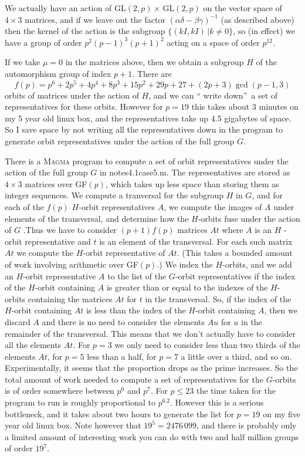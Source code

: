 \documentclass[10pt]{article}
\begin{document}
We actually have an action of GL$(2,p)\times \,$GL$(2,p)$ on the vector
space of $4\times 3$ matrices, and if we leave out the factor $(\alpha
\delta -\beta \gamma )^{-1}$ (as described above) then the kernel of the
action is the subgroup $\{(kI,kI)\,|$\thinspace $k\neq 0\}$, so (in effect)
we have a group of order $p^{2}\left( p-1\right) ^{3}\left( p+1\right) ^{2}$
acting on a space of order $p^{12}$.

If we take $\mu =0$ in the matrices above, then we obtain a subgroup $H$ of
the automorphism group of index $p+1$. There are 
\[
f(p)=p^{6}+2p^{5}+4p^{4}+8p^{3}+15p^{2}+29p+27+(2p+3)\gcd (p-1,3)
\]%
orbits of matrices under the action of $H$, and we can \textquotedblleft
write down\textquotedblright\ a set of representatives for these orbits.
However for $p=19$ this takes about 3 minutes on my 5 year old linux box,
and the representatives take up 4.5 gigabytes of space. So I save space by
not writing all the representatives down in the program to generate orbit
representatives under the action of the full group $G$.

There is a \textsc{Magma} program to compute a set of orbit representatives
under the action of the full group $G$ in notes4.1case5.m. The
representatives are stored as $4\times 3$ matrices over GF$(p)$, which takes
up less space than storing them as integer sequences. We compute a
tranversal for the subgroup $H$ in $G$, and for each of the $f(p)$ $H$-orbit
representatives $A$, we compute the images of $A$ under elements of the
transversal, and determine how the $H$-orbits fuse under the action of $G$%
.Thus we have to consider $(p+1)f(p)$ matrices $At$ where $A$ is an $H$%
-orbit representative and $t$ is an element of the transversal. For each
such matrix $At$ we compute the $H$-orbit representative of $At$. (This
takes a bounded amount of work involving arithmetic over GF$(p)$.) We index
the $H$-orbits, and we add an $H$-orbit representative $A$ to the list of
the $G$-orbit representatives if the index of the $H$-orbit containing $A$
is greater than or equal to the indexes of the $H$-orbits containing the
matrices $At$ for $t$ in the transversal. So, if the index of the $H$-orbit
containing $At$ is less than the index of the $H$-orbit containing $A$, then
we discard $A$ and there is no need to consider the elements $Au$ for $u$ in
the remainder of the transversal. This means that we don't actually have to
consider all the elements $At$. For $p=3$ we only need to consider less than
two thirds of the elements $At$, for $p=5$ less than a half, for $p=7$ a
little over a third, and so on. Experimentally, it seems that the proportion
drops as the prime increases. So the total amount of work needed to compute
a set of representatives for the $G$-orbits is of order somewhere between $%
p^{6}$ and $p^{7}$. For $p\leq 23$ the time taken for the program to run is
roughly proportional to $p^{6.2}$. However this is a serious bottleneck, and
it takes about two hours to generate the list for $p=19$ on my five year old
linux box. Note however that $19^{5}=\allowbreak 2476\,099$, and there is
probably only a limited amount of interesting work you can do with two and
half million groups of order $19^{7}$.
\end{document}
